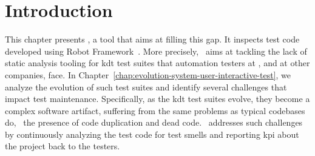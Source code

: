 \section{Introduction}

This chapter presents \tool, a tool that aims at filling this gap. It inspects test code developed using Robot Framework~\cite{RobotFramework2020}. More precisely, \tool~aims at tackling the lack of static analysis tooling for \gls{kdt} test suites that automation testers at \BGL, and at other companies, face. In Chapter~\ref{chap:evolution-system-user-interactive-test}, we analyze the evolution of such test suites and identify several challenges that impact test maintenance. Specifically, as the \gls{kdt} test suites evolve, they become a complex software artifact, suffering from the same problems as typical codebases do, \eg\ the presence of code duplication and dead code. \tool~addresses such challenges by continuously analyzing the test code for test smells and reporting \gls{kpi} about the project back to the testers.